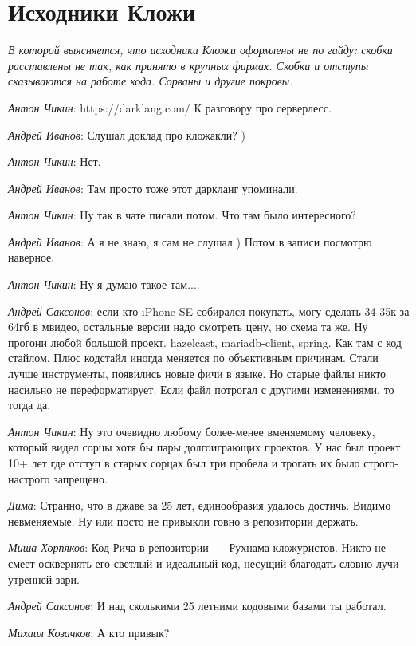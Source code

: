 \documentclass[10pt]{book}
\newcommand{\AUTHOR}[1]{\emph{#1}:}
\newenvironment{teaser}{\vspace{-3em}\slshape}{\vspace{1em}}
\begin{document}
\chapter{Исходники Кложи}

\begin{teaser}
В которой выясняется, что исходники Кложи оформлены не по гайду: скобки
расставлены не так, как принято в крупных фирмах. Скобки и отступы сказываются
на работе кода. Сорваны и другие покровы.
\end{teaser}

\AUTHOR{Антон Чикин} https://darklang.com/ К разговору про серверлесс.

\AUTHOR{Андрей Иванов} Слушал доклад про кложакли? )

\AUTHOR{Антон Чикин} Нет.

\AUTHOR{Андрей Иванов} Там просто тоже этот даркланг упоминали.

\AUTHOR{Антон Чикин} Ну так в чате писали потом. Что там было интересного?

\AUTHOR{Андрей Иванов} А я не знаю, я сам не слушал ) Потом в записи посмотрю
наверное.

\AUTHOR{Антон Чикин} Ну я думаю такое там....

\AUTHOR{Андрей Саксонов} если кто iPhone SE собирался покупать, могу сделать 34-35к за
64гб в мвидео, остальные версии надо смотреть цену, но схема та же. Ну прогони
любой большой проект. hazelcast, mariadb-client, spring. Как там с код
стайлом. Плюс кодстайл иногда меняется по объективным причинам. Стали лучше
инструменты, появились новые фичи в языке. Но старые файлы никто насильно не
переформатирует. Если файл потрогал с другими изменениями, то тогда да.

\AUTHOR{Антон Чикин} Ну это очевидно любому более-менее вменяемому человеку,
который видел сорцы хотя бы пары долгоиграющих проектов. У нас был проект 10+
лет где отступ в старых сорцах был три пробела и трогать их было строго-настрого
запрещено.

\AUTHOR{Дима} Странно, что в джаве за 25 лет, единообразия удалось
достичь. Видимо невменяемые. Ну или посто не привыкли говно в репозитории
держать.

\AUTHOR{Миша Хорпяков} Код Рича в репозитории~--- Рухнама кложуристов. Никто не
смеет осквернять его светлый и идеальный код, несущий благодать словно лучи
утренней зари.

\AUTHOR{Андрей Саксонов} И над сколькими 25 летними кодовыми базами ты работал.

\AUTHOR{Михаил Козачков} А кто привык?
\end{document}
